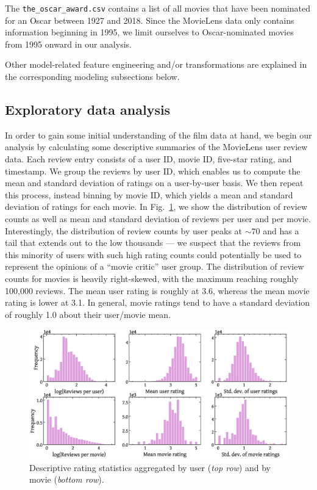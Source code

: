 \documentclass[dvipsnames]{article}
\begin{document}
The \texttt{the\_oscar\_award.csv} contains a list of all movies that have been nominated for an Oscar between 1927 and 2018. Since the MovieLens data only contains information beginning in 1995, we limit ourselves to Oscar-nominated movies from 1995 onward in our analysis.

Other model-related feature engineering and/or transformations are explained in the corresponding modeling subsections below.


\subsection{Exploratory data analysis}

In order to gain some initial understanding of the film data at hand, we begin our analysis by calculating some descriptive summaries of the MovieLens user review data. Each review entry consists of a user ID, movie ID, five-star rating, and timestamp. We group the reviews by user ID, which enables us to compute the mean and standard deviation of ratings on a user-by-user basis. We then repeat this process, instead binning by movie ID, which yields a mean and standard deviation of ratings for each movie. In Fig.~\ref{fig:eda1}, we show the distribution of review counts as well as mean and standard deviation of reviews per user and per movie. Interestingly, the distribution of review counts by user peaks at ${\sim}70$ and has a tail that extends out to the low thousands --- we suspect that the reviews from this minority of users with such high rating counts could potentially be used to represent the opinions of a ``movie critic'' user group. The distribution of review counts for movies is heavily right-skewed, with the maximum reaching roughly 100,000 reviews. The mean user rating is roughly at 3.6, whereas the mean movie rating is lower at 3.1. In general, movie ratings tend to have a standard deviation of roughly 1.0 about their user/movie mean.

\begin{figure}
    \centering
    \includegraphics[width=\textwidth]{movielens_eda1.eps}
    \caption{Descriptive rating statistics aggregated by user ({\it top row}) and by movie ({\it bottom row}).}
    \label{fig:eda1}
\end{figure}
\end{document}

